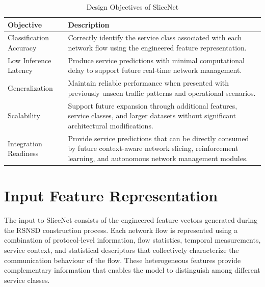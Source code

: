 \documentclass[12pt,a4paper]{report}
\begin{document}
\begin{table}[H]
	\centering
	\caption{Design Objectives of SliceNet}
	\label{tab:slicenet_objectives}
	
	\begin{tabular}{|p{5cm}|p{7cm}|}
		\hline
		
		\textbf{Objective} &
		\textbf{Description}
		\\
		\hline
		
		Classification Accuracy &
		Correctly identify the service class associated with each network flow using the engineered feature representation.
		\\
		\hline
		
		Low Inference Latency &
		Produce service predictions with minimal computational delay to support future real-time network management.
		\\
		\hline
		
		Generalization &
		Maintain reliable performance when presented with previously unseen traffic patterns and operational scenarios.
		\\
		\hline
		
		Scalability &
		Support future expansion through additional features, service classes, and larger datasets without significant architectural modifications.
		\\
		\hline
		
		Integration Readiness &
		Provide service predictions that can be directly consumed by future context-aware network slicing, reinforcement learning, and autonomous network management modules.
		\\
		\hline
		
	\end{tabular}
	
\end{table}

	\section{Input Feature Representation}
	\label{sec:features}
	
	The input to SliceNet consists of the engineered feature vectors generated during the RSNSD construction process. Each network flow is represented using a combination of protocol-level information, flow statistics, temporal measurements, service context, and statistical descriptors that collectively characterize the communication behaviour of the flow. These heterogeneous features provide complementary information that enables the model to distinguish among different service classes.
	
\end{document}
